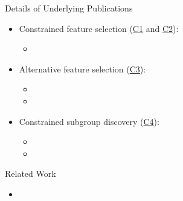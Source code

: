 \documentclass[en, navbarinline, handout]{sdqbeamer}
\begin{document}
\begin{frame}[t]{Details of Underlying Publications}
	\begin{itemize}
		\item Constrained feature selection (\hyperlink{slide:contributions}{C1} and \hyperlink{slide:contributions}{C2}):
		\begin{itemize}
			\item {}
		\end{itemize}
		\item Alternative feature selection (\hyperlink{slide:contributions}{C3}):
		\begin{itemize}
			\item {}
			\item {}
		\end{itemize}
		\item Constrained subgroup discovery (\hyperlink{slide:contributions}{C4}):
		\begin{itemize}
			\item {}
			\item {}
		\end{itemize}
	\end{itemize}
\end{frame}

\begin{frame}[t]{Related Work}
	\begin{itemize}
		\item
	\end{itemize}
\end{frame}

\backupend
\end{document}
